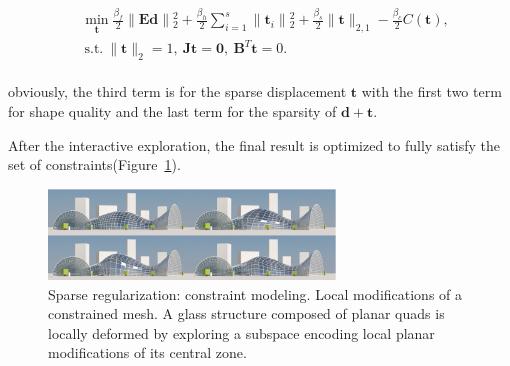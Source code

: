\small{
\begin{equation}
 \label{eq:localmodeling1}
 \begin{split}
 & \min_{\mathbf{t}}  \frac{\beta_{f}}{2} \| \mathbf{Ed} \|{_2^2}
                      +\frac{\beta_{h}}{2} \sum_{i=1}^{s} \| \mathbf{t}_{i} \|{_2^2}
                      +\frac{\beta_{s}}{2} \| \mathbf{t} \|_{2,1}
                      -\frac{\beta_{c}}{2} C(\mathbf{t}),\\
 & ~\textrm{s.t.}~ \| \mathbf{t} \|_2=1,~\mathbf{Jt}=\mathbf{0},~\mathbf{B}^{T}\mathbf{t}=0.
 \end{split}
\end{equation}
}
\\
obviously, the third term is for the sparse displacement $\mathbf{t}$
with the first two term for shape quality and
the last term for the sparsity of $\mathbf{d}+\mathbf{t}$.


After the interactive exploration, the final result is optimized to fully satisfy the set of constraints(Figure~\ref{fig:localmodeling}).

\begin{figure}[ht]
  \centering
  \includegraphics[width=3.0in]{images/localmodeling}
  \caption{Sparse regularization: constraint modeling\cite{deng2013exploring}. Local modifications of a constrained mesh. A glass structure composed of planar quads is locally deformed by exploring a subspace encoding local planar modifications of its central zone.}
  \label{fig:localmodeling}
\end{figure}



